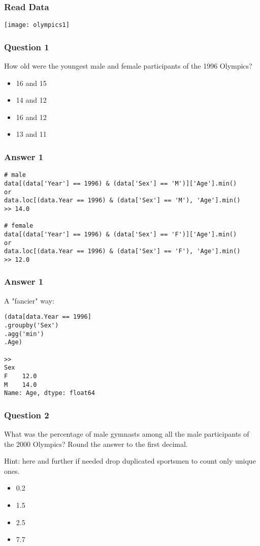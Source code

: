 \begin{frame}[fragile]\frametitle{Read Data}	
\begin{center}
\texttt{[image: olympics1]}
\end{center}
\end{frame}

\begin{frame}[fragile]\frametitle{Question 1}	
How old were the youngest male and female participants of the 1996 Olympics?
\begin{itemize}
\item 16 and 15
\item 14 and 12
\item 16 and 12
\item 13 and  11
\end{itemize}

\end{frame}

\begin{frame}[fragile]\frametitle{Answer 1}
\begin{lstlisting}
# male
data[(data['Year'] == 1996) & (data['Sex'] == 'M')]['Age'].min()
or
data.loc[(data.Year == 1996) & (data['Sex'] == 'M'), 'Age'].min()
>> 14.0

# female
data[(data['Year'] == 1996) & (data['Sex'] == 'F')]['Age'].min()
or
data.loc[(data.Year == 1996) & (data['Sex'] == 'F'), 'Age'].min()
>> 12.0
\end{lstlisting}

\end{frame}

\begin{frame}[fragile]\frametitle{Answer 1}
A "fancier" way:
\begin{lstlisting}
(data[data.Year == 1996]
.groupby('Sex')
.agg('min')
.Age)

>>
Sex
F    12.0
M    14.0
Name: Age, dtype: float64
\end{lstlisting}

\end{frame}



\begin{frame}[fragile]\frametitle{Question 2}	
 What was the percentage of male gymnasts among all the male participants of the 2000 Olympics? Round the answer to the first decimal.

Hint: here and further if needed drop duplicated sportsmen to count only unique ones.
\begin{itemize}
\item 0.2
\item 1.5
\item 2.5
\item 7.7
\end{itemize}

\end{frame}

